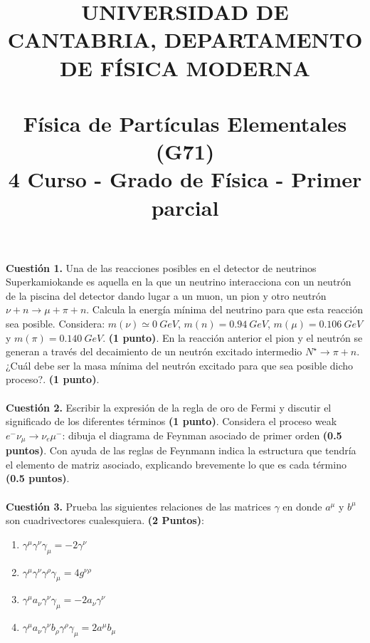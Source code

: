 \documentclass[paper=a4, fontsize=11pt]{scrartcl} %
\date{}
\title{	
\normalfont \normalsize 
\textsc{UNIVERSIDAD DE CANTABRIA, DEPARTAMENTO DE FÍSICA MODERNA} \\ [20pt] %
\horrule{0.5pt} \\[0.4cm] %
\huge Física de Partículas Elementales (G71) \\ %
\normalsize 4 Curso - Grado de Física - Primer parcial
\horrule{2pt} \\[0.5cm] %
}
\numberwithin{equation}{section} %
\numberwithin{figure}{section} %
\numberwithin{table}{section} %
\begin{document}
\maketitle %

\vspace{-2.5cm}

\textbf{Cuestión 1.} Una de las reacciones posibles en el detector de neutrinos Superkamiokande es aquella en la que un 
neutrino interacciona con un neutrón de la piscina del detector dando lugar a un muon, un pion y otro neutrón $\nu + n\rightarrow\mu + \pi + n$.
Calcula la energía mínima del neutrino para que esta reacción sea posible. Considera: $m(\nu)\simeq 0~GeV$, $m(n)= 0.94~GeV$, $m(\mu) = 0.106~GeV$ y $m(\pi) = 0.140~GeV$. \textbf{(1 punto)}.
En la reacción anterior el pion y el neutrón se generan a través del decaimiento de un neutrón excitado intermedio $N^{\star}\rightarrow\pi + n$. ¿Cuál debe ser la masa mínima
del neutrón excitado para que sea posible dicho proceso?. \textbf{(1 punto)}. 
\\
\\
\textbf{Cuestión 2.} Escribir la expresión de la regla de oro de Fermi y discutir el significado de los diferentes términos \textbf{(1 punto)}. Considera el proceso weak $e^{-}\nu_\mu\rightarrow\nu_e\mu^{-}$: dibuja el diagrama de Feynman asociado de primer orden \textbf{(0.5 puntos)}. Con ayuda de las reglas de Feynmann indica la estructura que tendría el elemento de matriz asociado, explicando brevemente lo que es cada término \textbf{(0.5 puntos)}.
\\
\\
\textbf{Cuestión 3.} Prueba las siguientes relaciones de las matrices $\gamma$ en donde $a^\mu$ y $b^\mu$ son cuadrivectores cualesquiera. \textbf{(2 Puntos)}: 
\begin{enumerate}
\item $\gamma^\mu\gamma^\nu\gamma_\mu=-2\gamma^\nu$
\item $\gamma^\mu\gamma^\nu\gamma^\rho\gamma_\mu = 4g^{\nu\rho}$
\item $\gamma^\mu a_\nu \gamma^{\nu}\gamma_\mu = -2a_\nu\gamma^{\nu}$
\item $\gamma^\mu a_\nu \gamma^{\nu} b_\rho \gamma^{\rho} \gamma_\mu = 2 a^{\mu}b_\mu$
\end{enumerate}
\end{document}
